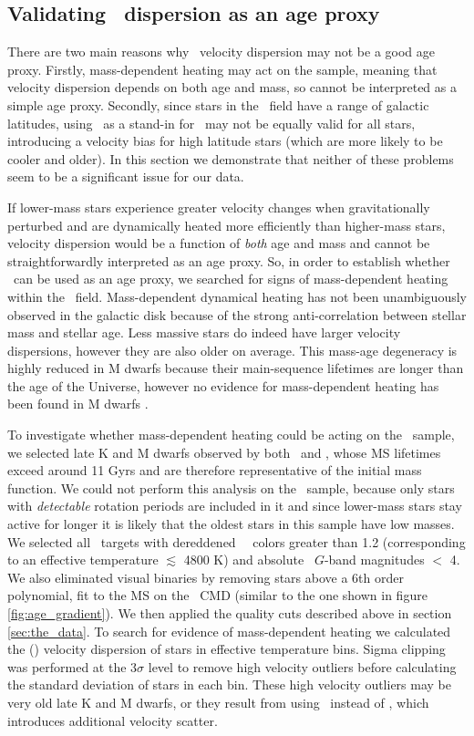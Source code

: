 \subsection{Validating \vb\ dispersion as an age proxy}
\label{sec:mass-dependent-heating}

There are two main reasons why \vb\ velocity dispersion may not be a good age
proxy.
Firstly, mass-dependent heating may act on the sample, meaning that velocity
dispersion depends on both age and mass, so cannot be interpreted as a simple
age proxy.
Secondly, since stars in the \kepler\ field have a range of galactic
latitudes, using \vb\ as a stand-in for \vz\ may not be equally valid for all
stars, introducing a velocity bias for high latitude stars (which are more
likely to be cooler and older).
In this section we demonstrate that neither of these problems seem to be a
significant issue for our data.

If lower-mass stars experience greater velocity changes when gravitationally
perturbed and are dynamically heated more efficiently than higher-mass stars,
velocity dispersion would be a function of {\it both} age and mass and cannot
be straightforwardly interpreted as an age proxy.
So, in order to establish whether \sigmavb\ can be used as an age proxy, we
searched for signs of mass-dependent heating within the \kepler\ field.
Mass-dependent dynamical heating has not been unambiguously observed in the
galactic disk because of the strong anti-correlation between stellar mass and
stellar age.
Less massive stars do indeed have larger velocity dispersions, however they
are also older on average.
This mass-age degeneracy is highly reduced in M dwarfs because their
main-sequence lifetimes are longer than the age of the Universe, however no
evidence for mass-dependent heating has been found in M dwarfs
\citep[\eg][]{faherty2009, newton2016}.

To investigate whether mass-dependent heating could be acting on the \kepler\
sample, we selected late K and M dwarfs observed by both \kepler\ and \gaia,
whose MS lifetimes exceed around 11 Gyrs and are therefore representative of
the initial mass function.
We could not perform this analysis on the \mct\ sample, because only stars
with {\it detectable} rotation periods are included in it and since lower-mass
stars stay active for longer it is likely that the oldest stars in this sample
have low masses.
We selected all \kepler\ targets with dereddened \gaia\ \gcolor\ colors
greater than 1.2 (corresponding to an effective temperature $\lesssim$
4800 K) and absolute \gaia\ $G$-band magnitudes $<$ 4.
We also eliminated visual binaries by removing stars above a 6th order
polynomial, fit to the MS on the \gaia\ CMD (similar to the one shown in
figure \ref{fig:age_gradient}).
We then applied the quality cuts described above in section
\ref{sec:the_data}.
To search for evidence of mass-dependent heating we calculated the (\vb)
velocity dispersion of stars in effective temperature bins.
Sigma clipping was performed at the 3$\sigma$ level to remove high velocity
outliers before calculating the standard deviation of stars in each bin.
These high velocity outliers may be very old late K and M dwarfs, or they
result from using \vb\ instead of \vz, which introduces additional velocity
scatter.

